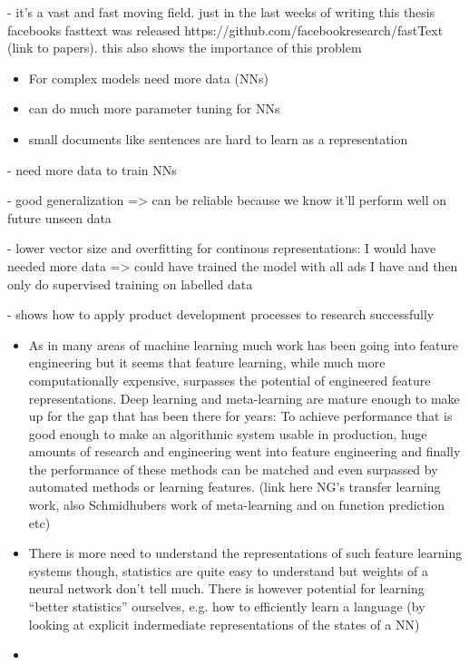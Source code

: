 - it's a vast and fast moving field. just in the last weeks of writing this thesis facebooks fasttext was released https://github.com/facebookresearch/fastText (link to papers). this also shows the importance of this problem

\begin{itemize}
  \item For complex models need more data (NNs)
  \item can do much more parameter tuning for NNs
  \item small documents like sentences are hard to learn as a representation
\end{itemize}

- need more data to train NNs

- good generalization => can be reliable because we know it'll perform well on future unseen data


- lower vector size and overfitting for continous representations: I would have needed more data => could have trained the model with all ads I have and then only do supervised training on labelled data

- shows how to apply product development processes to research successfully

\begin{itemize}
  \item As in many areas of machine learning much work has been going into feature engineering but it seems that feature learning, while much more computationally expensive, surpasses the potential of engineered feature representations. Deep learning and meta-learning are mature enough to make up for the gap that has been there for years: To achieve performance that is good enough to make an algorithmic system usable in production, huge amounts of research and engineering went into feature engineering and finally the performance of these methods can be matched and even surpassed by automated methods or learning features. (link here NG's transfer learning work, also Schmidhubers work of meta-learning and on function prediction etc)
  \item There is more need to understand the representations of such feature learning systems though, statistics are quite easy to understand but weights of a neural network don't tell much. There is however potential for learning ``better statistics'' ourselves, e.g. how to efficiently learn a language (by looking at explicit indermediate representations of the states of a NN)
  \item
\end{itemize}


